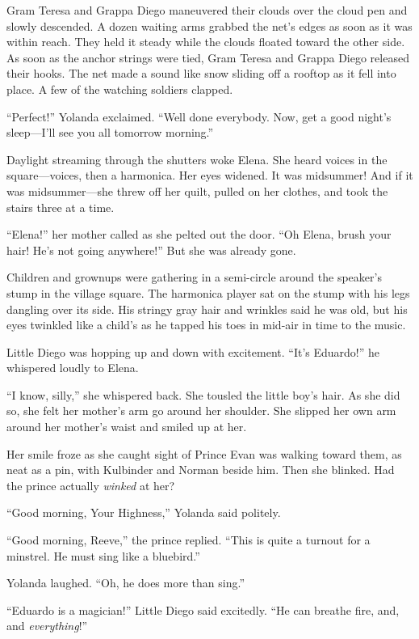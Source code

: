 \documentclass[10pt]{book}
\begin{document}
Gram Teresa and Grappa Diego maneuvered their clouds over the cloud pen and slowly descended. A dozen waiting arms grabbed the net's edges as soon as it was within reach. They held it steady while the clouds floated toward the other side. As soon as the anchor strings were tied, Gram Teresa and Grappa Diego released their hooks. The net made a sound like snow sliding off a rooftop as it fell into place.  A few of the watching soldiers clapped.

``Perfect!'' Yolanda exclaimed. ``Well done everybody.  Now, get a good night's sleep---I'll see you all tomorrow morning.''

Daylight streaming through the shutters woke Elena.  She heard voices in the square---voices, then a harmonica.  Her eyes widened.  It was midsummer!  And if it was midsummer---she threw off her quilt, pulled on her clothes, and took the stairs three at a time.

``Elena!'' her mother called as she pelted out the door. ``Oh Elena, brush your hair! He's not going anywhere!'' But she was already gone.

Children and grownups were gathering in a semi-circle around the speaker's stump in the village square. The harmonica player sat on the stump with his legs dangling over its side. His stringy gray hair and wrinkles said he was old, but his eyes twinkled like a child's as he tapped his toes in mid-air in time to the music.

Little Diego was hopping up and down with excitement. ``It's Eduardo!'' he whispered loudly to Elena.

``I know, silly,'' she whispered back. She tousled the little boy's hair. As she did so, she felt her mother's arm go around her shoulder. She slipped her own arm around her mother's waist and smiled up at her.

Her smile froze as she caught sight of Prince Evan was walking toward them, as neat as a pin, with Kulbinder and Norman beside him.  Then she blinked.  Had the prince actually \emph{winked} at her?

``Good morning, Your Highness,'' Yolanda said politely.

``Good morning, Reeve,'' the prince replied. ``This is quite a turnout for a minstrel. He must sing like a bluebird.''

Yolanda laughed. ``Oh, he does more than sing.''

``Eduardo is a magician!'' Little Diego said excitedly. ``He can breathe fire, and, and \emph{everything}!''
\end{document}
